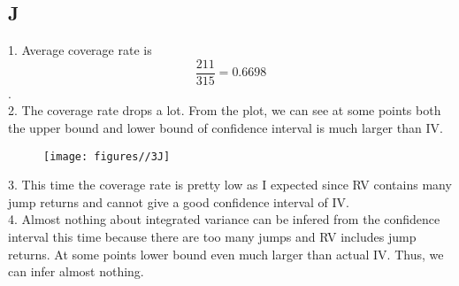 \documentclass{report}
\begin{document}
\subsection{J}

1. Average coverage rate is \[ \frac{211}{315} = 0.6698 \].\\
2. The coverage rate drops a lot. From the plot, we can see at some points both the upper bound and lower bound of confidence interval is much larger than IV.\\
\begin{figure}[H]
        \centering 
         \texttt{[image: figures//3J]}
\end{figure}
3. This time the coverage rate is pretty low as I expected since RV contains many jump returns and cannot give a good confidence interval of IV. \\
4. Almost nothing about integrated variance can be infered from the confidence interval this time because there are too many jumps and RV includes jump returns. At some points lower bound even much larger than actual IV. Thus, we can infer almost nothing.
\end{document}
